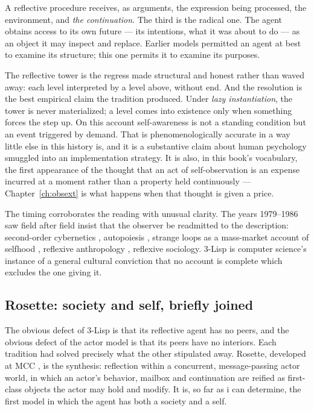A reflective procedure receives, as arguments, the expression being
processed, the environment, and \emph{the continuation}.
The third is the radical one.
The agent obtains access to its own future --- its intentions, what
it was about to do --- as an object it may inspect and replace.
Earlier models permitted an agent at best to examine its structure;
this one permits it to examine its purposes.

The reflective tower is the regress made structural and honest
rather than waved away: each level interpreted by a level above,
without end.
And the resolution is the best empirical claim the tradition
produced.
Under \emph{lazy instantiation}, the tower is never materialized; a
level comes into existence only when something forces the step up.
On this account self-awareness is not a standing condition but an
event triggered by demand.
That is phenomenologically accurate in a way little else in this
history is, and it is a substantive claim about human psychology
smuggled into an implementation strategy.
It is also, in this book's vocabulary, the first appearance of the
thought that an act of self-observation is an expense incurred at a
moment rather than a property held continuously ---
Chapter~\ref{ch:obsext} is what happens when that thought is given a
price.

The timing corroborates the reading with unusual clarity.
The years 1979--1986 saw field after field insist that the observer
be readmitted to the description: second-order cybernetics
\cite{vonfoerster1981}, autopoiesis \cite{maturana1980}, strange
loops as a mass-market account of selfhood \cite{hofstadter1979},
reflexive anthropology \cite{clifford1986}, reflexive sociology.
3-Lisp is computer science's instance of a general cultural
conviction that no account is complete which excludes the one giving
it.

\subsection{Rosette: society and self, briefly joined}

The obvious defect of 3-Lisp is that its reflective agent has no
peers, and the obvious defect of the actor model is that its peers
have no interiors.
Each tradition had solved precisely what the other stipulated away.
Rosette, developed at MCC \cite{rosette1991,tomlinson1989}, is the
synthesis: reflection within a concurrent, message-passing actor
world, in which an actor's behavior, mailbox and continuation are
reified as first-class objects the actor may hold and modify.
It is, so far as i can determine, the first model in which the agent
has both a society and a self.

